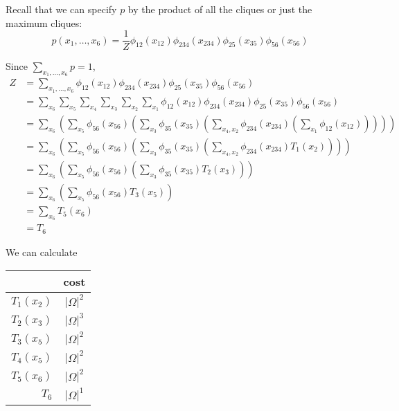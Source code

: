 \documentclass[12pt]{report}
\newcommand{\abs}[1]{\left\vert #1 \right\vert}
\begin{document}
Recall that we can specify $p$ by the product of all the cliques or just the maximum cliques:
\[p(x_1, \dots, x_6) = \frac{1}{Z} \phi_{12}(x_{12}) \phi_{234}(x_{234}) \phi_{25}(x_{35}) \phi_{56}(x_{56})\]

Since $\sum_{x_1, \dots, x_6} p = 1$,
\begin{align*}
	Z & = \sum_{x_1, \dots, x_6} \phi_{12}(x_{12}) \phi_{234}(x_{234}) \phi_{25}(x_{35}) \phi_{56}(x_{56})                                                                                             \\
	  & = \sum_{x_6} \sum_{x_5} \sum_{x_4} \sum_{x_3} \sum_{x_2} \sum_{x_1} \phi_{12}(x_{12}) \phi_{234}(x_{234}) \phi_{25}(x_{35}) \phi_{56}(x_{56})                                                  \\
	  & = \sum_{x_6} \left(\sum_{x_5} \phi_{56}(x_{56}) \left(\sum_{x_3} \phi_{35}(x_{35}) \left(\sum_{x_4, x_2} \phi_{234}(x_{234}) \left(\sum_{x_1} \phi_{12}(x_{12})\right) \right) \right) \right) \\
	  & = \sum_{x_6} \left(\sum_{x_5} \phi_{56}(x_{56}) \left(\sum_{x_3} \phi_{35}(x_{35}) \left(\sum_{x_4, x_2} \phi_{234}(x_{234}) T_1(x_2)\right) \right) \right)                                   \\
	  & = \sum_{x_6} \left(\sum_{x_5} \phi_{56}(x_{56}) \left(\sum_{x_3} \phi_{35}(x_{35}) T_2(x_3) \right)\right)                                                                                     \\
	  & = \sum_{x_6} \left(\sum_{x_5} \phi_{56}(x_{56}) T_3(x_5)\right)                                                                                                                                \\
	  & = \sum_{x_6} T_5(x_6)                                                                                                                                                                          \\
	  & = T_6
\end{align*}

We can calculate
\qquad \begin{tabular}{r|c}
	           & cost             \\\hline
	$T_1(x_2)$ & $\abs{\Omega}^2$ \\
	$T_2(x_3)$ & $\abs{\Omega}^3$ \\
	$T_3(x_5)$ & $\abs{\Omega}^2$ \\
	$T_4(x_5)$ & $\abs{\Omega}^2$ \\
	$T_5(x_6)$ & $\abs{\Omega}^2$ \\
	$T_6$      & $\abs{\Omega}^1$ \\
\end{tabular}
\end{document}
